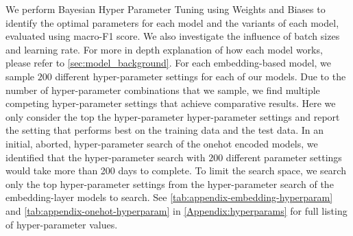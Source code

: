 We perform Bayesian Hyper Parameter Tuning using Weights and Biases \cite{Wandb} to identify the optimal parameters for each model and the variants of each model, evaluated using macro-F1 score. We also investigate the influence of batch sizes and learning rate. For more in depth explanation of how each model works, please refer to \autoref{sec:model_background}.\vspace{5mm}
For each embedding-based model, we sample $200$ different hyper-parameter settings for each of our models. Due to the number of hyper-parameter combinations that we sample, we find multiple competing hyper-parameter settings that achieve comparative results. Here we only consider the top 
the hyper-parameter hyper-parameter settings and report the setting that performs best on the training data and the test data. In an initial, aborted, hyper-parameter search of the onehot encoded models, we identified that the hyper-parameter search with $200$ different parameter settings would take more than 200 days to complete.
To limit the search space, we search only the top
hyper-parameter settings from the hyper-parameter search of the embedding-layer models to search. See \autoref{tab:appendix-embedding-hyperparam} and \autoref{tab:appendix-onehot-hyperparam} in \autoref{Appendix:hyperparams} for full listing of hyper-parameter values.

